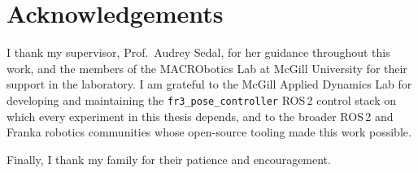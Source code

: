 \chapter*{\rm\bfseries Acknowledgements}

I thank my supervisor, Prof.\ Audrey Sedal, for her guidance throughout
this work, and the members of the MACRObotics Lab at McGill University
for their support in the laboratory. I am grateful to the McGill Applied
Dynamics Lab for developing and maintaining the
\texttt{fr3\_pose\_controller} ROS\,2 control stack on which every
experiment in this thesis depends, and to the broader ROS\,2 and Franka
robotics communities whose open-source tooling made this work possible.

Finally, I thank my family for their patience and encouragement.

